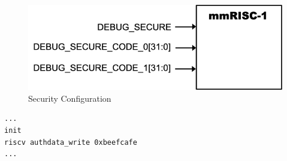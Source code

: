 \begin{figure}[H]
    \includegraphics[width=0.75\columnwidth]{./Figure/Security.png}
    \caption{Security Configuration}
    \label{fig:SECURITY}
\end{figure}

\begin{lstlisting}[caption=Authentication Command in OpenOCD Configuration File, label=list:SECURE_OPENOCD, captionpos=b, frame=single, basicstyle=\ttfamily\scriptsize]
...
init
riscv authdata_write 0xbeefcafe
...
\end{lstlisting}




